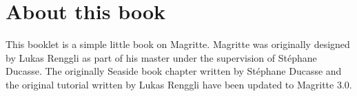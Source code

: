 \documentclass[a4paper,10pt,twoside]{book}
\begin{document}
\frontmatter
\pagestyle{plain}


\chapter*{About this book}

This booklet is a simple little book on Magritte. Magritte was originally designed by Lukas Renggli 
as part of his master under the supervision of St\'ephane Ducasse. The originally Seaside book chapter written by St\'ephane Ducasse and the original tutorial written 
by Lukas Renggli have been updated to Magritte 3.0.

\tableofcontents
\sloppy %
\mainmatter







\printindex
\end{document}
